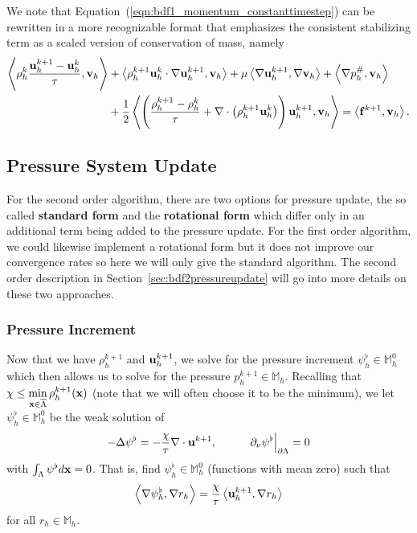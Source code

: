 \documentclass[letterpaper]{erdc}
\begin{document}
We note that Equation~(\ref{eqn:bdf1_momentum_constanttimestep}) can be rewritten in a more recognizable format that emphasizes the consistent stabilizing term as a scaled version of conservation of mass, namely
\begin{equation}\label{eqn:bdf1morerecognizableform}
  \begin{split}
\left\langle \rho_h^{k} \frac{\textbf{u}_h^{k+1}-\textbf{u}_h^{k} }{\tau} , \textbf{v}_h \right\rangle &+ \left\langle  \rho_h^{k+1}\textbf{u}_h^{k}\cdot\nabla\textbf{u}_h^{k+1} , \textbf{v}_h \right\rangle + \mu\left\langle  \nabla \textbf{u}_h^{k+1} , \nabla\textbf{v}_h \right\rangle+\left\langle \nabla p_h^{\#}, \textbf{v}_h \right\rangle\\
 &+ \frac{1}{2}\left\langle  \left(\frac{\rho_h^{k+1} - \rho_h^{k}}{\tau} + \nabla\cdot\left(\rho_h^{k+1}\textbf{u}_h^{k}\right)  \right)\textbf{u}_h^{k+1} , \textbf{v}_h \right\rangle = \left\langle \mathbf{f}^{k+1}, \textbf{v}_h \right\rangle.
\end{split}
\end{equation}

%
%
\subsection{Pressure System Update}\label{sec:bdf1pressureupdate}
\begin{remark}For the second order algorithm, there are two options for pressure update, the so called \textbf{standard form} and the \textbf{rotational form} which differ only in an additional term being added to the pressure update.  For the first order algorithm, we could likewise implement a rotational form but it does not improve our convergence rates so here we will only give the standard algorithm.  The second order description in Section~\ref{sec:bdf2pressureupdate} will go into more details on these two approaches.\end{remark}

\subsubsection{Pressure Increment}
Now that we have $\rho_h^{k+1}$ and $\textbf{u}_h^{k+1}$, we solve for the pressure increment $\psi_h^{\flat}\in \mathbb{M}_h^0$ which then allows us to solve for the pressure $p_h^{k+1}\in \mathbb{M}_h$.  
Recalling that $\chi \leq \displaystyle\min_{\textbf{x}\in\overline{\Lambda}} \rho_h^{k+1}(\textbf{x})$ (note that we will often choose it to be the minimum), we let $\psi_h^{\flat}\in \mathbb{M}_h^0$ be the weak solution of
\begin{equation}\label{eqn:pressureincrementlaplacian}
  -\Delta \psi^{\flat} = -\frac{\chi}{\tau}\nabla\cdot \textbf{u}^{k+1}, \hspace{1cm} \left.\partial_\nu\psi^{\flat}\right|_{\partial\Lambda} = 0
\end{equation}
with $\int_{\Lambda} \psi^{\flat} d\textbf{x} = 0$.  That is, find $\psi_h^{\flat}\in \mathbb{M}_h^0$ (functions with mean zero) such that
\begin{equation}
  \left\langle \nabla\psi_h^{\flat}, \nabla r_h \right\rangle = \frac{\chi}{\tau}\left\langle \textbf{u}_h^{k+1}, \nabla r_h \right\rangle
\end{equation}
for all $r_h \in \mathbb{M}_h$.  
\end{document}
